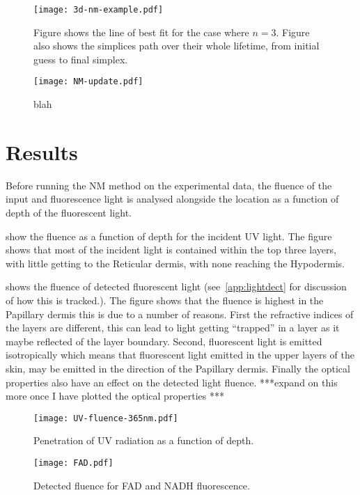 \begin{figure}[!htpb]
  \centering
  \texttt{[image: 3d-nm-example.pdf]}
  \caption{Figure shows the line of best fit for the case where $n=3$. Figure also shows the simplices path over their whole lifetime, from initial guess to final simplex.}
  \label{fig:3dtoymodel}
\end{figure}


\begin{figure}[!htpb]
  \centering
  \texttt{[image: NM-update.pdf]}
  \caption{blah}
  \label{fig:NMupdate}
\end{figure}




\FloatBarrier
\section{Results}

Before running the NM method on the experimental data, the fluence of the input and fluorescence light is analysed alongside the location as a function of depth of the fluorescent light.

 show the fluence as a function of depth for the incident UV light.
The figure shows that most of the incident light is contained within the top three layers, with little getting to the Reticular dermis, with none reaching the Hypodermis.

 shows the fluence of detected fluorescent light (see~\cref{app:lightdect} for discussion of how this is tracked.).
The figure shows that the fluence is highest in the Papillary dermis this is due to a number of reasons.
First the refractive indices of the layers are different, this can lead to light getting ``trapped'' in a layer as it maybe reflected of the layer boundary.
Second, fluorescent light is emitted isotropically which means that fluorescent light emitted in the upper layers of the skin, may be emitted in the direction of the Papillary dermis.
Finally the optical properties also have an effect on the detected light fluence.
***expand on this more once I have plotted the optical properties ***

\begin{figure}[!htpb]
    \centering
    \texttt{[image: UV-fluence-365nm.pdf]}
    \caption{Penetration of UV radiation as a function of depth.}
    \label{fig:uvpen}
\end{figure}

\begin{figure}[!htpb]
    \centering
    \texttt{[image: FAD.pdf]}
    \caption{Detected fluence for FAD and NADH fluorescence.}
    \label{fig:fadnadhboth}
\end{figure}

